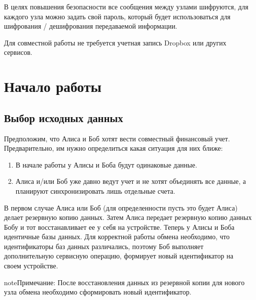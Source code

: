 \documentclass[a4paper,10pt,russian]{sphinxmanual}
\begin{document}
В целях повышения безопасности все сообщения между узлами шифруются, для каждого узла можно задать свой пароль, который будет использоваться для шифрования / дешифрования передаваемой информации.

Для совместной работы не требуется учетная запись Dropbox или других сервисов.


\section{Начало работы}
\label{\detokenize{teamwork:id3}}

\subsection{Выбор исходных данных}
\label{\detokenize{teamwork:id4}}
Предположим, что Алиса и Боб хотят вести совместный финансовый учет. Предварительно, им нужно определиться какая ситуация для них ближе:
\begin{enumerate}
\def\theenumi{\arabic{enumi}}
\def\labelenumi{\theenumi .}
\makeatletter\def\p@enumii{\p@enumi \theenumi .}\makeatother
\item {} 
В начале работы у Алисы и Боба будут одинаковые данные.

\item {} 
Алиса и/или Боб уже давно ведут учет и не хотят объединять все данные, а планируют синхронизировать лишь отдельные счета.

\end{enumerate}

В первом случае Алиса или Боб (для определенности пусть это будет Алиса) делает резервную копию данных. Затем Алиса передает резервную
копию данных Бобу и тот восстанавливает ее у себя на устройстве. Теперь у Алисы и Боба идентичные базы данных. Для корректной работы обмена
необходимо, что идентификаторы баз данных различались, поэтому Боб выполняет дополнительную сервисную операцию, формирует новый идентификатор на своем устройстве.

\begin{sphinxadmonition}{note}{Примечание:}
После восстановления данных из резервной копии для нового узла обмена необходимо сформировать новый идентификатор.
\end{sphinxadmonition}

\noindent{}

\noindent{}
\end{document}
